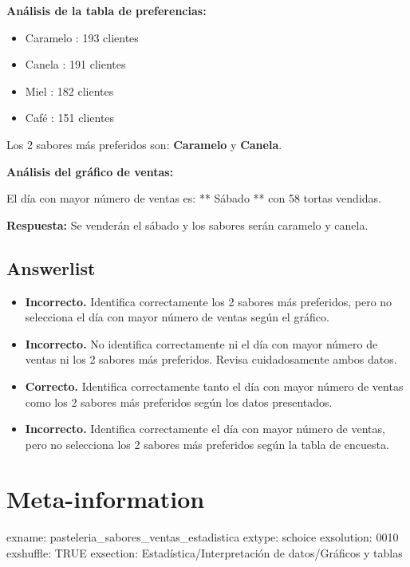 \documentclass[
]{article}
\providecommand{\tightlist}{%
  \setlength{\itemsep}{0pt}\setlength{\parskip}{0pt}}
\begin{document}
\textbf{Análisis de la tabla de preferencias:}

\begin{itemize}
\tightlist
\item
  Caramelo : 193 clientes
\item
  Canela : 191 clientes
\item
  Miel : 182 clientes
\item
  Café : 151 clientes
\end{itemize}

Los 2 sabores más preferidos son: \textbf{Caramelo} y \textbf{Canela}.

\textbf{Análisis del gráfico de ventas:}

El día con mayor número de ventas es: ** Sábado ** con 58 tortas
vendidas.

\textbf{Respuesta:} Se venderán el sábado y los sabores serán caramelo y
canela.

\subsection{Answerlist}\label{answerlist-1}

\begin{itemize}
\tightlist
\item
  \textbf{Incorrecto.} Identifica correctamente los 2 sabores más
  preferidos, pero no selecciona el día con mayor número de ventas según
  el gráfico.
\item
  \textbf{Incorrecto.} No identifica correctamente ni el día con mayor
  número de ventas ni los 2 sabores más preferidos. Revisa
  cuidadosamente ambos datos.
\item
  \textbf{Correcto.} Identifica correctamente tanto el día con mayor
  número de ventas como los 2 sabores más preferidos según los datos
  presentados.
\item
  \textbf{Incorrecto.} Identifica correctamente el día con mayor número
  de ventas, pero no selecciona los 2 sabores más preferidos según la
  tabla de encuesta.
\end{itemize}

\section{Meta-information}\label{meta-information}

exname: pasteleria\_sabores\_ventas\_estadistica extype: schoice
exsolution: 0010 exshuffle: TRUE exsection: Estadística/Interpretación
de datos/Gráficos y tablas
\end{document}
